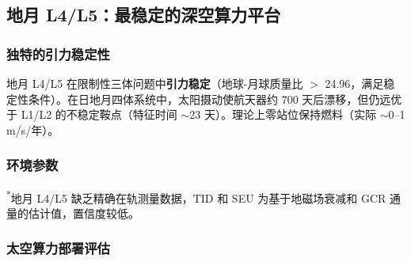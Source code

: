 \subsection{地月 L4/L5：最稳定的深空算力平台}

\subsubsection{独特的引力稳定性}

地月 L4/L5 在限制性三体问题中\textbf{引力稳定}（地球-月球质量比 $>$ 24.96，满足稳定性条件）。在日地月四体系统中，太阳摄动使航天器约 700 天后漂移，但仍远优于 L1/L2 的不稳定鞍点（特征时间 $\sim$23 天）。理论上零站位保持燃料（实际 $\sim$0--1 m/s/年）。

\subsubsection{环境参数}

\begin{table}[H]
\centering
\caption{地月 L4/L5 关键参数 vs LEO}
\label{tab:l4l5-params}

\smallskip
\noindent\textsuperscript{*}地月 L4/L5 缺乏精确在轨测量数据，TID 和 SEU 为基于地磁场衰减和 GCR 通量的估计值，置信度较低。
\end{table}

\subsubsection{太空算力部署评估}

